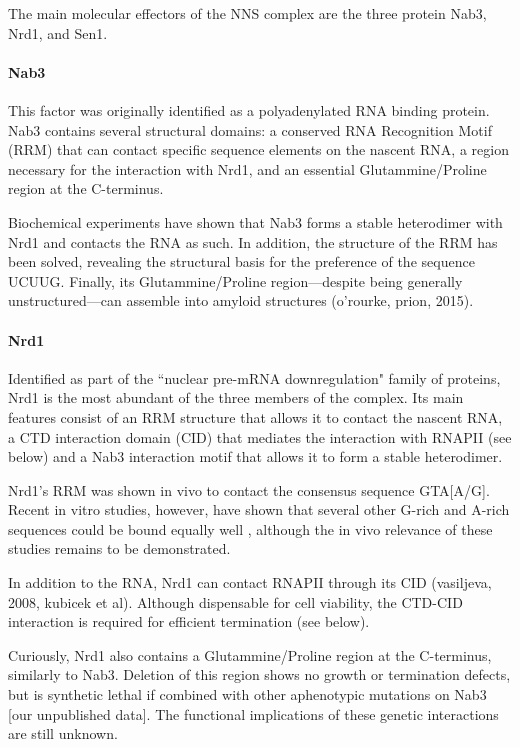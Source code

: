 The main molecular effectors of the NNS complex are the three protein Nab3, Nrd1, and Sen1.


\paragraph{Nab3}

This factor was originally identified as a polyadenylated RNA binding protein. 
Nab3 contains several structural domains: a conserved RNA Recognition Motif (RRM) that can contact specific sequence elements on the nascent RNA, a region necessary for the interaction with Nrd1, and an essential Glutammine/Proline region at the C-terminus.

Biochemical experiments have shown that Nab3 forms a stable heterodimer with Nrd1 and contacts the RNA as such. 
In addition, the structure of the RRM has been solved, revealing the structural basis for the preference of the sequence UCUUG. 
Finally, its Glutammine/Proline region---despite being generally unstructured---can assemble into amyloid structures (o’rourke, prion, 2015).


\paragraph{Nrd1}

Identified as part of the ``nuclear pre-mRNA downregulation" family of proteins, Nrd1 is the most abundant of the three members of the complex. 
Its main features consist of an RRM structure that allows it to contact the nascent RNA, a CTD interaction domain (CID) that mediates the interaction with RNAPII (see below) and a Nab3 interaction motif that allows it to form a stable heterodimer.

Nrd1's RRM was shown in vivo to contact the consensus sequence GTA[A/G]. 
Recent in vitro studies, however, have shown that several other G-rich and A-rich sequences could be bound equally well \citep{bacikova:2014:structure}, although the in vivo relevance of these studies remains to be demonstrated. 

In addition to the RNA, Nrd1 can contact RNAPII through its CID (vasiljeva, 2008, kubicek et al). 
Although dispensable for cell viability, the CTD-CID interaction is required for efficient termination (see below).

Curiously, Nrd1 also contains a Glutammine/Proline region at the C-terminus, similarly to Nab3. 
Deletion of this region shows no growth or termination defects, but is synthetic lethal if combined with other aphenotypic mutations on Nab3 [our unpublished data]. 
The functional implications of these genetic interactions are still unknown.
 

